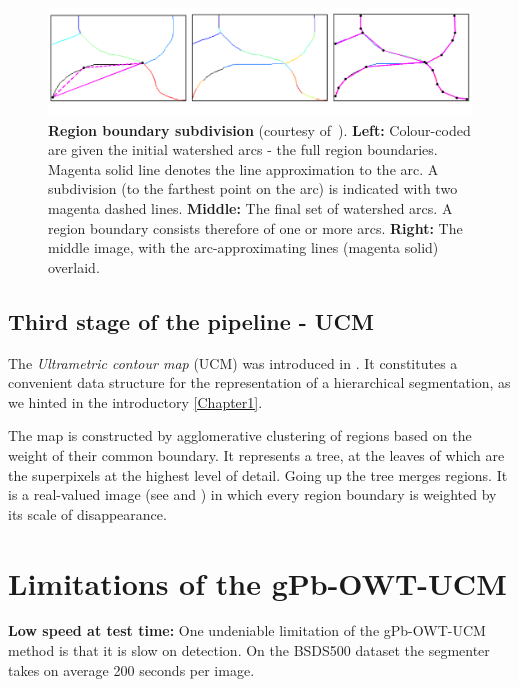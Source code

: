 \begin{figure}[ht!]
 \centering
 \includegraphics[width=1\textwidth]{images/gPb-OWT-UCM/Arbelaez11-contour-subdivision.png}
 \caption[Region boundary subdivision]{{\bf Region boundary subdivision} (courtesy of~\cite{Arbelaez11}). {\bf Left:} Colour-coded are given the initial watershed arcs - the full region boundaries. Magenta solid line denotes the line approximation to the arc. A subdivision (to the farthest point on the arc) is indicated with two magenta dashed lines. {\bf Middle:} The final set of watershed arcs. A region boundary consists therefore of one or more arcs. {\bf Right:} The middle image, with the arc-approximating lines (magenta solid) overlaid.}
 \label{fig:Arbelaez11-contour-subdivision}
\end{figure}

\subsection{Third stage of the pipeline - UCM}
\label{sec:ch3-UCM}
The {\it Ultrametric contour map} (UCM) was introduced in \cite{Arbelaez2006boundary}. It constitutes a convenient data structure for the representation of a hierarchical segmentation, as we hinted in the introductory \cref{Chapter1}. 

The map is constructed by agglomerative clustering of regions based on the weight of their common boundary. It represents a tree, at the leaves of which are the superpixels at the highest level of detail. Going up the tree merges regions. It is a real-valued image (see  and ) in which every region boundary is weighted by its scale of disappearance.




\section{Limitations of the gPb-OWT-UCM} %
\textbf{Low speed at test time:} One undeniable %
limitation of the gPb-OWT-UCM method is that it is slow on detection. On the BSDS500 dataset the segmenter takes on average 200 seconds per image.

